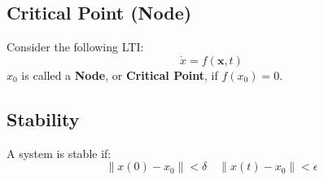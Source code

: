 
\subsection{Critical Point (Node)}

\begin{tcolorbox}[colback=blue!10,colframe=blue!50!blue,title=\textbf{Critical Point (Node)}]
Consider the following LTI:
\[
\dot{x} = f(\mathbf{x}, t)
\]
\(x_0\) is called a \textbf{Node}, or \textbf{Critical Point}, if \(f(x_0) = 0\).
\end{tcolorbox}

\subsection{Stability}
A system is stable if:
\[
\|x(0) - x_0 \| < \delta \quad \| x(t) -x_0\| < \epsilon
\]




